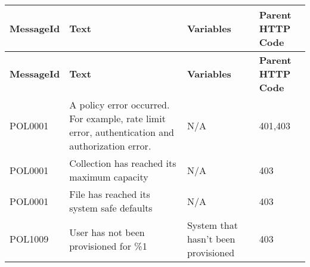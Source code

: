 \begin{longtable}{|>{\raggedright}p{}|>{\raggedright}p{}|>{\raggedright}p{}|>{\raggedright}p{}|}
\hline
\hline 
\textbf{\footnotesize{MessageId}} & \textbf{\footnotesize{Text}} & \textbf{\footnotesize{Variables}} & \textbf{\footnotesize{Parent HTTP Code}}\tabularnewline
\hline 
\hline
\endfirsthead
\hline
\hline 
\textbf{\footnotesize{MessageId}} & \textbf{\footnotesize{Text}} & \textbf{\footnotesize{Variables}} & \textbf{\footnotesize{Parent HTTP Code}}\tabularnewline
\hline 
\hline
\endhead
\hline 
{\footnotesize{POL0001}} & {\footnotesize{A policy error occurred. For example, rate limit error,
authentication and authorization error.}} & {\footnotesize{N/A}} & {\footnotesize{401,403}}\tabularnewline
\hline 
{\footnotesize{POL0001}} & {\footnotesize{Collection has reached its maximum capacity}} & {\footnotesize{N/A}} & {\footnotesize{403}}\tabularnewline
\hline 
{\footnotesize{POL0001}} & {\footnotesize{File has reached its system safe defaults}} & {\footnotesize{N/A}} & {\footnotesize{403}}\tabularnewline
\hline 
{\footnotesize{POL1009}} & {\footnotesize{User has not been provisioned for \%1}} & {\footnotesize{System that hasn’t been provisioned}} & {\footnotesize{403}}\tabularnewline
\hline 
\end{longtable}
